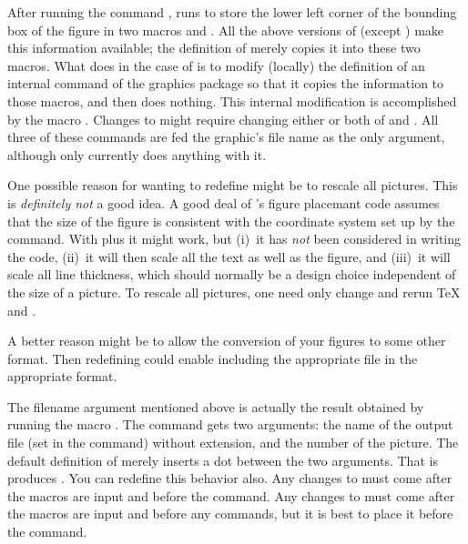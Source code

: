 \documentclass[letterpaper]{article}
\begin{document}
After running the command , \mfp{} runs
 to store the lower left corner of the bounding box
of the figure in two macros  and . All the
above versions of  (except )
make this information available; the definition of 
merely copies it into these two macros. What \mfp{} does in the
case of  is to modify (locally) the definition of an
internal command of the graphics package so that it copies the
information to those macros, and then  does nothing.
This internal modification is accomplished by the macro
. Changes to  might require
changing either or both of  and
. All three of these commands are fed the graphic's
file name as the only argument, although only 
currently does anything with it.

One possible reason for wanting to redefine  might
be to rescale all pictures. This is \emph{definitely not} a good idea. A
good deal of \mfp{}'s figure placemant code assumes that the size of the
figure is consistent with the coordinate system set up by the 
command. With  plus  it might work, but
(i)~it has \emph{not} been considered in writing the \mfp{} code,
(ii)~it will then scale all the text as well as the figure, and (iii)~it
will scale all line thickness, which should normally be a design choice
independent of the size of a picture. To rescale all pictures, one need
only change  and rerun \TeX{} and \MP{}.

A better reason might be to allow the conversion of your \MP{} figures
to some other format. Then redefining 
could enable including the appropriate file in the appropriate format.

The filename argument mentioned above is actually the result obtained by
running the macro .
The command  gets two arguments: the name of the \MP{}
output file (set in the  command) without extension,
and the number of the picture. The default definition of
 merely inserts a dot between the two arguments. That is
 produces . You can
redefine this behavior also. Any changes to  must come
after the \mfp{} macros are input and before the
 command. Any changes to  must
come after the \mfp{} macros are input and before any 
commands, but it is best to place it before the 
command.
\end{document}
